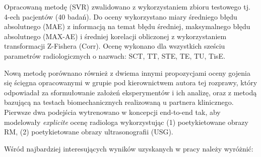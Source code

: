 Opracowaną metodę (SVR) zwalidowano z wykorzystaniem zbioru testowego tj. 4-ech pacjentów (40 badań). Do oceny wykorzystano miary średniego błędu absolutnego (MAE) z informacją na temat błędu średniej, maksymalnego błędu absolutnego (MAX-AE) i średniej korelacji obliczonej z wykorzystaniem transformacji Z-Fishera (Corr). Ocenę wykonano dla wszystkich sześciu parametrów radiologicznych o nazwach: SCT, TT, STE, TE, TU, TisE.

Nową metodę porównano również z dwiema innymi propozycjami oceny gojenia się ścięgna opracowanymi w grupie pod kierownictwem autora tej rozprawy, który odpowiadał za sformułowanie założeń eksperymentów i ich analizę, oraz z metodą bazującą na testach biomechanicznych realizowaną u partnera klinicznego. Pierwsze dwa podejścia wytrenowano w koncepcji end-to-end tak, aby modelowały \textit{explicite} ocenę radiologa wykorzystując (1) poetykietowane obrazy RM, (2) poetykietowane obrazy ultrasonografii (USG).

Wśród najbardziej interesujących wyników uzyskanych w pracy należy wyróżnić:


